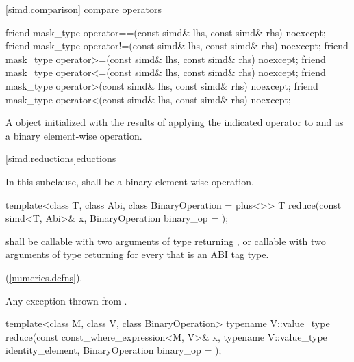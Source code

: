 [simd.comparison]{ compare operators}

\begin{itemdecl}
friend mask_type operator==(const simd& lhs, const simd& rhs) noexcept;
friend mask_type operator!=(const simd& lhs, const simd& rhs) noexcept;
friend mask_type operator>=(const simd& lhs, const simd& rhs) noexcept;
friend mask_type operator<=(const simd& lhs, const simd& rhs) noexcept;
friend mask_type operator>(const simd& lhs, const simd& rhs) noexcept;
friend mask_type operator<(const simd& lhs, const simd& rhs) noexcept;
\end{itemdecl}

\begin{itemdescr}
  \pnum\returns
  A  object initialized with the results of applying the indicated operator to  and  as a binary element-wise operation.
\end{itemdescr}

[simd.reductions]{\texorpdfstring{}{simd r}eductions}

\pnum
In this subclause,  shall be a binary element-wise operation.

\begin{itemdecl}
template<class T, class Abi, class BinaryOperation = plus<>>
  T reduce(const simd<T, Abi>& x, BinaryOperation binary_op = {});
\end{itemdecl}

\begin{itemdescr}
  \pnum\requires
   shall be callable with two arguments of type  returning , or callable with two arguments of type  returning  for every  that is an ABI tag type.

  \pnum\returns
   \foralli (\ref{numerics.defns}).

  \pnum\throws
  Any exception thrown from .

\end{itemdescr}

\begin{itemdecl}
template<class M, class V, class BinaryOperation>
  typename V::value_type reduce(const const_where_expression<M, V>& x,
                                typename V::value_type identity_element,
                                BinaryOperation binary_op = {});
\end{itemdecl}

